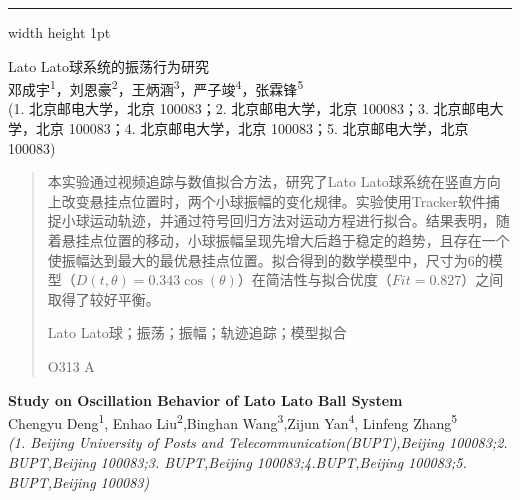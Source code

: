 \documentclass[12pt,a4paper]{article}
\begin{document}
\thispagestyle{firstpage}

\vspace*{-2cm}
\hrule width \textwidth height 1pt
\vspace{1.5cm}

\begin{center}
    {\heiti Lato Lato球系统的振荡行为研究} \\[0.5\baselineskip]

    {\kaishu 邓成宇\textsuperscript{1}，刘恩豪\textsuperscript{2}，王炳涵\textsuperscript{3}，严子竣\textsuperscript{4}，张霖锋\textsuperscript{5}} \\[0.3\baselineskip]

    {\kaishu (1. 北京邮电大学，北京 100083；2. 北京邮电大学，北京 100083；3. 北京邮电大学，北京 100083；4. 北京邮电大学，北京 100083；5. 北京邮电大学，北京 100083)} \\[0.5\baselineskip]
\end{center}

\begin{quote}
    \songti
    \setlength{\leftskip}{2em}
    \setlength{\rightskip}{2em}

     本实验通过视频追踪与数值拟合方法，研究了Lato Lato球系统在竖直方向上改变悬挂点位置时，两个小球振幅的变化规律。实验使用Tracker软件捕捉小球运动轨迹，并通过符号回归方法对运动方程进行拟合。结果表明，随着悬挂点位置的移动，小球振幅呈现先增大后趋于稳定的趋势，且存在一个使振幅达到最大的最优悬挂点位置。拟合得到的数学模型中，尺寸为6的模型（$D(t, \theta) = 0.343 \cos(\theta)$）在简洁性与拟合优度（$Fit=0.827$）之间取得了较好平衡。

    \vspace{0.5\baselineskip}
     Lato Lato球；振荡；振幅；轨迹追踪；模型拟合

     O313  A
\end{quote}

\vspace{1cm}

\begin{center}
    {\fontsize{15}{18}\selectfont\bfseries Study on Oscillation Behavior of Lato Lato Ball System} \\[0.3\baselineskip]

    {\fontsize{10.5}{12.6}\selectfont Chengyu Deng\textsuperscript{1}, Enhao Liu\textsuperscript{2},Binghan Wang\textsuperscript{3},Zijun Yan\textsuperscript{4}, Linfeng Zhang\textsuperscript{5}} \\[0.3\baselineskip]

    {\fontsize{9}{10.8}\selectfont\itshape (1. Beijing University of Posts and Telecommunication(BUPT),Beijing 100083;2. BUPT,Beijing 100083;3. BUPT,Beijing 100083;4.BUPT,Beijing 100083;5. BUPT,Beijing 100083)} \\[0.5\baselineskip]
\end{center}
\end{document}
